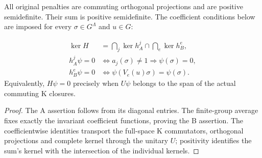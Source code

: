 \begin{theorem}
    \label{thm:peps_qd_original_kernel}

    All original penalties are commuting orthogonal projections and
    are positive semidefinite. Their sum is positive semidefinite. The
    coefficient conditions below are imposed for every $\sigma\in G^\Lambda$
    and $u\in G$:

    \begin{align}
        \ker H
          &=\bigcap_j\ker h_A^j\cap\bigcap_e\ker h_B^e,\\
        h_A^j\psi=0
          &\iff a_j(\sigma)\ne1\Longrightarrow\psi(\sigma)=0,\\
        h_B^e\psi=0
          &\iff\psi(V_e(u)\sigma)=\psi(\sigma).
    \end{align}
    Equivalently, $H\psi=0$ precisely when $U\psi$ belongs to the span
    of the actual commuting K closures.
\end{theorem}
\begin{proof}
    The A assertion follows from its diagonal entries. The finite-group
    average fixes exactly the invariant coefficient functions, proving
    the B assertion. The coefficientwise identities transport the
    full-space K commutators, orthogonal projections and complete kernel
    through the unitary $U$; positivity identifies the sum's kernel with
    the intersection of the individual kernels.
\end{proof}

